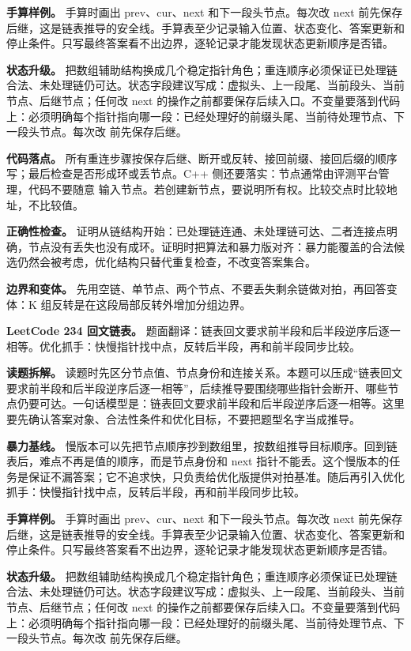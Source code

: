 \textbf{手算样例。} 手算时画出 prev、cur、next 和下一段头节点。每次改 next 前先保存后继，这是链表推导的安全线。手算表至少记录输入位置、状态变化、答案更新和停止条件。只写最终答案看不出边界，逐轮记录才能发现状态更新顺序是否错。

\textbf{状态升级。} 把数组辅助结构换成几个稳定指针角色；重连顺序必须保证已处理链合法、未处理链仍可达。状态字段建议写成：虚拟头、上一段尾、当前段头、当前节点、后继节点；任何改 next 的操作之前都要保存后续入口。不变量要落到代码上：必须明确每个指针指向哪一段：已经处理好的前缀头尾、当前待处理节点、下一段头节点。每次改  前先保存后继。

\textbf{代码落点。} 所有重连步骤按保存后继、断开或反转、接回前缀、接回后缀的顺序写；最后检查是否形成环或丢节点。C++ 侧还要落实：节点通常由评测平台管理，代码不要随意  输入节点。若创建新节点，要说明所有权。比较交点时比较地址，不比较值。

\textbf{正确性检查。} 证明从链结构开始：已处理链连通、未处理链可达、二者连接点明确，节点没有丢失也没有成环。证明时把算法和暴力版对齐：暴力能覆盖的合法候选仍然会被考虑，优化结构只替代重复检查，不改变答案集合。

\textbf{边界和变体。} 先用空链、单节点、两个节点、不要丢失剩余链做对拍，再回答变体：K 组反转是在这段局部反转外增加分组边界。

\noindent\textbf{LeetCode 234 回文链表。} 题面翻译：链表回文要求前半段和后半段逆序后逐一相等。优化抓手：快慢指针找中点，反转后半段，再和前半段同步比较。

\textbf{读题拆解。} 读题时先区分节点值、节点身份和连接关系。本题可以压成“链表回文要求前半段和后半段逆序后逐一相等”，后续推导要围绕哪些指针会断开、哪些节点仍要可达。一句话模型是：链表回文要求前半段和后半段逆序后逐一相等。这里要先确认答案对象、合法性条件和优化目标，不要把题型名字当成推导。

\textbf{暴力基线。} 慢版本可以先把节点顺序抄到数组里，按数组推导目标顺序。回到链表后，难点不再是值的顺序，而是节点身份和 next 指针不能丢。这个慢版本的任务是保证不漏答案；它不追求快，只负责给优化版提供对拍基准。随后再引入优化抓手：快慢指针找中点，反转后半段，再和前半段同步比较。

\textbf{手算样例。} 手算时画出 prev、cur、next 和下一段头节点。每次改 next 前先保存后继，这是链表推导的安全线。手算表至少记录输入位置、状态变化、答案更新和停止条件。只写最终答案看不出边界，逐轮记录才能发现状态更新顺序是否错。

\textbf{状态升级。} 把数组辅助结构换成几个稳定指针角色；重连顺序必须保证已处理链合法、未处理链仍可达。状态字段建议写成：虚拟头、上一段尾、当前段头、当前节点、后继节点；任何改 next 的操作之前都要保存后续入口。不变量要落到代码上：必须明确每个指针指向哪一段：已经处理好的前缀头尾、当前待处理节点、下一段头节点。每次改  前先保存后继。

